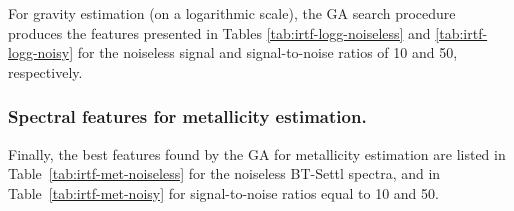 For gravity estimation (on a logarithmic scale), the GA search
procedure produces the features presented in
Tables \ref{tab:irtf-logg-noiseless} and \ref{tab:irtf-logg-noisy} for
the noiseless signal and signal-to-noise ratios of 10 and 50,
respectively.


\subsubsection{Spectral features for metallicity estimation.}

Finally, the best features found by the GA for metallicity estimation
are listed in Table~\ref{tab:irtf-met-noiseless} for the noiseless BT-Settl
spectra, and in Table~\ref{tab:irtf-met-noisy} for signal-to-noise
ratios equal to 10 and 50.

